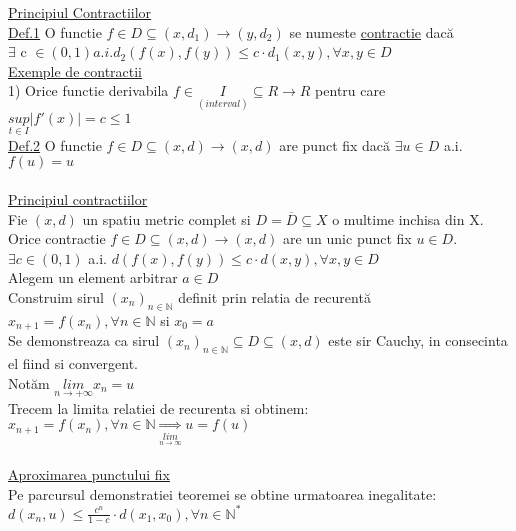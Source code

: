 \documentclass[12pt]{extarticle}
\begin{document}
	\huge \underline{Principiul Contractiilor} \\
	{\large
		\underline{Def.1} O functie $f \in D \subseteq (x, d_{1}) \rightarrow (y, d_{2})$ se numeste \underline{contractie} dacă \\
		$\exists$ c $\in (0, 1) a.i. d_{2}(f(x), f(y)) \leq c \cdot d_{1}(x, y), \forall x, y \in D$ \\
		\underline{Exemple de contractii} \\
		1) Orice functie derivabila $f \in \underset{(interval)}{I} \subseteq R \rightarrow R$ pentru care $\underset{t \in I}{sup}|f'(x)| = c \leq 1$ \\
		\underline{Def.2} O functie $f \in D \subseteq (x, d) \rightarrow (x, d)$ are punct fix dacă $\exists u \in D$ a.i. $f(u) = u$ \\
		\\
		\underline{Principiul contractiilor} \\
		Fie $(x, d)$ un spatiu metric complet si $D = \overline{D} \subseteq X$ o multime inchisa din X. Orice contractie $f \in D \subseteq (x, d) \rightarrow (x, d)$ are un unic punct fix $u \in D$. \\
		$\exists c \in (0, 1)$ a.i. $d(f(x), f(y)) \leq c \cdot d(x, y), \forall x, y \in D$ \\
		Alegem un element arbitrar $a \in D$ \\
		Construim sirul $(x_{n})_{n \in \mathbb{N}}$ definit prin relatia de recurentă $x_{n + 1} = f(x_{n}), \forall n \in \mathbb{N}$ si $x_{0} = a$ \\
		Se demonstreaza ca sirul $(x_{n})_{n \in \mathbb{N}} \subseteq D \subseteq (x, d)$ este sir Cauchy, in consecinta el fiind si convergent. \\
		Notăm $\underset{n \rightarrow +\infty}{lim}x_{n} = u$ \\
		Trecem la limita relatiei de recurenta si obtinem: \\
		$x_{n+1} = f(x_{n}), \forall n \in \mathbb{N} \underset{\underset{n \rightarrow \infty}{lim}}{\Rightarrow} u = f(u)$ \\
		\\
		\underline{Aproximarea punctului fix} \\
		Pe parcursul demonstratiei teoremei se obtine urmatoarea inegalitate: \\
		$d(x_{n}, u) \leq \frac{c^{n}}{1 - c} \cdot d(x_{1}, x_{0}), \forall n \in \mathbb{N}^{*}$ \\
		\\
	}
	\newpage
	
\end{document}

